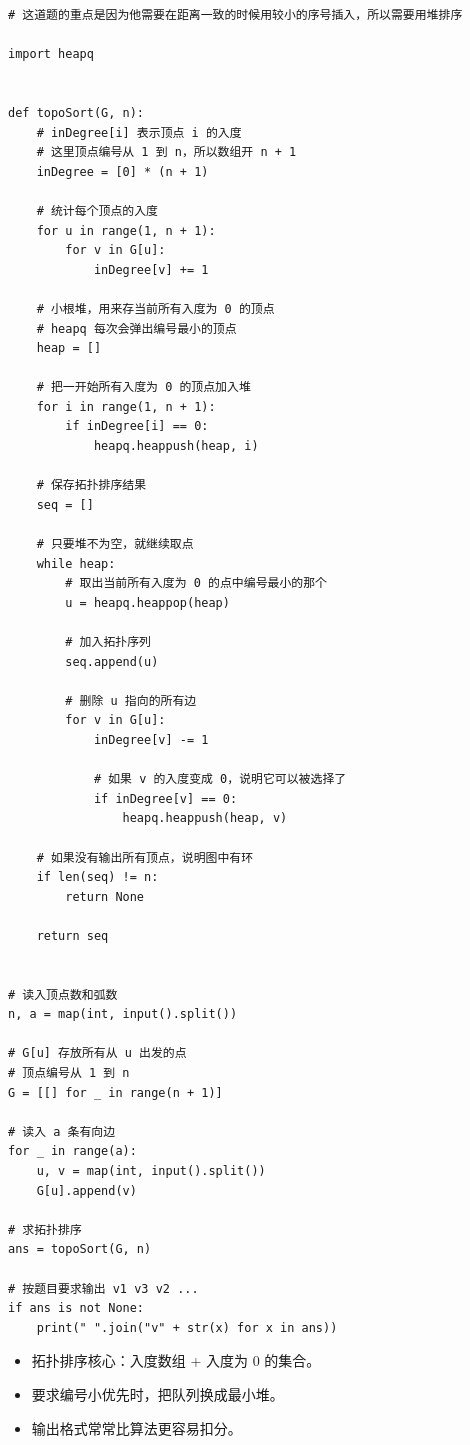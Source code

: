 \documentclass[10pt,a4paper,fontset=none]{ctexart}
\begin{document}
\begin{lstlisting}[style=py,caption={最终可用代码（对话来源）}]
# 这道题的重点是因为他需要在距离一致的时候用较小的序号插入，所以需要用堆排序

import heapq


def topoSort(G, n):
    # inDegree[i] 表示顶点 i 的入度
    # 这里顶点编号从 1 到 n，所以数组开 n + 1
    inDegree = [0] * (n + 1)

    # 统计每个顶点的入度
    for u in range(1, n + 1):
        for v in G[u]:
            inDegree[v] += 1

    # 小根堆，用来存当前所有入度为 0 的顶点
    # heapq 每次会弹出编号最小的顶点
    heap = []

    # 把一开始所有入度为 0 的顶点加入堆
    for i in range(1, n + 1):
        if inDegree[i] == 0:
            heapq.heappush(heap, i)

    # 保存拓扑排序结果
    seq = []

    # 只要堆不为空，就继续取点
    while heap:
        # 取出当前所有入度为 0 的点中编号最小的那个
        u = heapq.heappop(heap)

        # 加入拓扑序列
        seq.append(u)

        # 删除 u 指向的所有边
        for v in G[u]:
            inDegree[v] -= 1

            # 如果 v 的入度变成 0，说明它可以被选择了
            if inDegree[v] == 0:
                heapq.heappush(heap, v)

    # 如果没有输出所有顶点，说明图中有环
    if len(seq) != n:
        return None

    return seq


# 读入顶点数和弧数
n, a = map(int, input().split())

# G[u] 存放所有从 u 出发的点
# 顶点编号从 1 到 n
G = [[] for _ in range(n + 1)]

# 读入 a 条有向边
for _ in range(a):
    u, v = map(int, input().split())
    G[u].append(v)

# 求拓扑排序
ans = topoSort(G, n)

# 按题目要求输出 v1 v3 v2 ...
if ans is not None:
    print(" ".join("v" + str(x) for x in ans))
\end{lstlisting}
\begin{notebox}
\begin{itemize}
  \item 拓扑排序核心：入度数组 + 入度为 0 的集合。
  \item 要求编号小优先时，把队列换成最小堆。
  \item 输出格式常常比算法更容易扣分。
\end{itemize}
\end{notebox}
\end{document}
